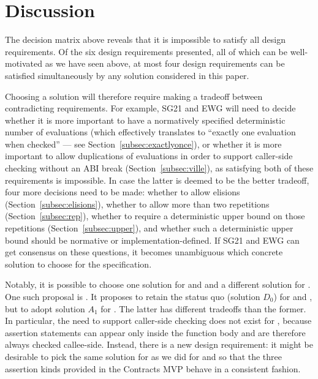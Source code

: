\pagebreak
\section{Discussion}

The decision matrix above reveals that it is impossible to satisfy all design requirements. Of the six design requirements presented, all of which can be well-motivated as we have seen above, at most four design requirements can be satisfied simultaneously by any solution considered in this paper.

Choosing a solution will therefore require making a tradeoff between  contradicting requirements. For example, SG21 and EWG will need to decide  whether it is more important to have a normatively specified deterministic number of evaluations (which effectively translates to ``exactly one evaluation when checked'' --- see Section~\ref{subsec:exactlyonce}), or whether it is more important to allow duplications of evaluations in order to support caller-side checking without an ABI break (Section~\ref{subsec:ville}), as satisfying both of these requirements is impossible. In case the latter is deemed to be the better tradeoff, four more decisions need to be made: whether to allow elisions (Section~\ref{subsec:elisions}), whether to allow more than two repetitions (Section~\ref{subsec:rep}), whether to require a deterministic upper bound on those repetitions (Section~\ref{subsec:upper}), and whether such a deterministic upper bound should be normative or implementation-defined. If SG21 and EWG can get consensus on these questions, it becomes unambiguous which concrete solution to choose for the specification.

Notably, it is possible to choose one solution for  and  and a different solution for \mbox{}. One such proposal is \cite{P3257R0}. It proposes to retain the status quo (solution $D_0$) for  and , but to adopt solution $A_1$ for . The latter has different tradeoffs than the former. In particular, the need to support caller-side checking does not exist for , because assertion statements can appear only inside the function body and are therefore always checked callee-side. Instead, there is a new design requirement: it might be desirable to pick the same solution for  as we did for  and  so that the three assertion kinds provided in the Contracts MVP behave in a consistent fashion.

